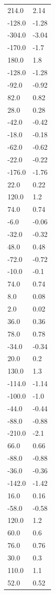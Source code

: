 \begin{longtable}{ll}
214.0 & 2.14 \\
-128.0 & -1.28 \\
-304.0 & -3.04 \\
-170.0 & -1.7 \\
180.0 & 1.8 \\
-128.0 & -1.28 \\
-92.0 & -0.92 \\
82.0 & 0.82 \\
28.0 & 0.28 \\
-42.0 & -0.42 \\
-18.0 & -0.18 \\
-62.0 & -0.62 \\
-22.0 & -0.22 \\
-176.0 & -1.76 \\
22.0 & 0.22 \\
120.0 & 1.2 \\
74.0 & 0.74 \\
-6.0 & -0.06 \\
-32.0 & -0.32 \\
48.0 & 0.48 \\
-72.0 & -0.72 \\
-10.0 & -0.1 \\
74.0 & 0.74 \\
8.0 & 0.08 \\
2.0 & 0.02 \\
36.0 & 0.36 \\
78.0 & 0.78 \\
-34.0 & -0.34 \\
20.0 & 0.2 \\
130.0 & 1.3 \\
-114.0 & -1.14 \\
-100.0 & -1.0 \\
-44.0 & -0.44 \\
-88.0 & -0.88 \\
-210.0 & -2.1 \\
66.0 & 0.66 \\
-88.0 & -0.88 \\
-36.0 & -0.36 \\
-142.0 & -1.42 \\
16.0 & 0.16 \\
-58.0 & -0.58 \\
120.0 & 1.2 \\
60.0 & 0.6 \\
76.0 & 0.76 \\
30.0 & 0.3 \\
110.0 & 1.1 \\
52.0 & 0.52 \\

\end{longtable}
